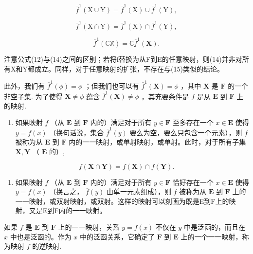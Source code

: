 \[
\overline {{f}} ^ {1} (\mathrm{X} \cup \mathrm{Y}) = \overline {{f}} ^ {1} (\mathrm{X}) \cup \overline {{f}} ^ {1} (\mathrm{Y}),\tag{14}
\]

\[
\bar {f} ^ {1} (\mathrm{X} \cap \mathrm{Y}) = \bar {f} ^ {1} (\mathrm{X}) \cap \bar {f} ^ {1} (\mathrm{Y}),\tag{15}
\]

\[
\overline {{f}} ^ {1} (\mathbb {C X}) = \mathbb {C} \overline {{f}} ^ {1} (\mathbf {X}).
\]

注意公式(12)与(14)之间的区别；若将f替换为从F到E的任意映射，则(14)并非对所有X和Y都成立。同样，对于任意映射的扩张，不存在与(15)类似的结论。

此外，我们有 \(\overline{f}^{1}(\phi) = \phi\) ；但我们也可以有 \(\overline{f}^{1}(\mathbf{X}) = \phi\) ，其中 \(\mathbf{X}\) 是 \(\mathbf{F}\) 的一个非空子集. 为了使得 \(\mathbf{X} \neq \phi\) 蕴含 \(\overline{f}^{1}(\mathbf{X}) \neq \phi\) ，其充要条件是 \(f\) 是从 \(\mathbf{E}\) 到 \(\mathbf{F}\) 上的映射.

\begin{enumerate}
\def\labelenumi{\arabic{enumi}.}
\setcounter{enumi}{7}
\tightlist
\item
  如果映射 \(f\) （从 \(\mathbf{E}\) 到 \(\mathbf{F}\) 内的）满足对于所有 \(y \in \mathbf{F}\) 至多存在一个 \(x \in \mathbf{E}\) 使得 \(y = f(x)\) （换句话说，集合 \(\overline{f}^1(y)\) 要么为空，要么只包含一个元素），则 \(f\) 被称为从 \(\mathbf{E}\) 到 \(\mathbf{F}\) 内的一一映射，或单射映射，或单射。此时，对于所有子集 \(\mathbf{X}, \mathbf{Y}\) （ \(\mathbf{E}\) 的）,
\end{enumerate}

\[
f (\mathbf {X} \cap \mathbf {Y}) = f (\mathbf {X}) \cap f (\mathbf {Y}).\tag{16}
\]

\begin{enumerate}
\def\labelenumi{\arabic{enumi}.}
\setcounter{enumi}{8}
\tightlist
\item
  如果映射 \(f\) （从 \(\mathbf{E}\) 到 \(\mathbf{F}\) 内的）满足对于所有 \(y \in \mathbf{F}\) 恰好存在一个 \(x \in \mathbf{E}\) 使得 \(y = f(x)\) （换言之， \(\overline{f}(y)\) 由单一元素组成），则 \(f\) 被称为从 \(\mathbf{E}\) 到 \(\mathbf{F}\) 上的一一映射，或双射映射，或双射。这样的映射可以刻画为既是E到F上的映射，又是E到F内的一一映射。
\end{enumerate}

如果 \(f\) 是 \(\mathbf{E}\) 到 \(\mathbf{F}\) 上的一一映射，关系 \(y = f(x)\) 不仅在 \(y\) 中是泛函的，而且在 \(x\) 中也是泛函的。作为 \(x\) 中的泛函关系，它确定了 \(\mathbf{F}\) 到 \(\mathbf{E}\) 上的一个一一映射，称为映射 \(f\) 的逆映射.

